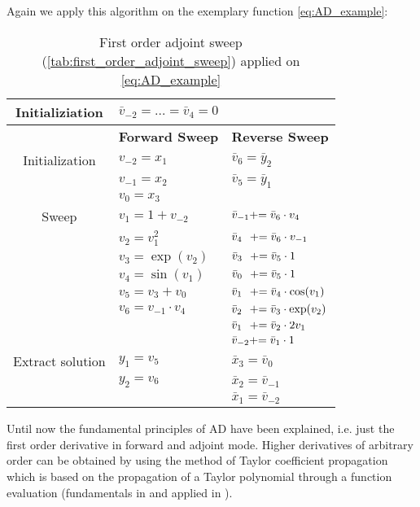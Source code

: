 \documentclass{scrartcl}[12pt, halfparskip]
\numberwithin{equation}{section}
\numberwithin{figure}{section}
\numberwithin{table}{section}
\begin{document}
Again we apply this algorithm on the exemplary function \cref{eq:AD_example}:

\begin{table}[H]
	\centering
	\begin{tabular}{| c | l | l |} \hline
		Initializiation & $\bar{v}_{-2}=\dots=\bar{v}_4=0$ & \\ \hline
		& \textbf{Forward Sweep} & \textbf{Reverse Sweep} \\ \hline
		Initialization & $v_{-2}=x_1$ & $\bar{v}_6=\bar{y}_2$ \\
		& $v_{-1}=x_2$ & $\bar{v}_5=\bar{y}_1$ \\
		& $v_{0}=x_3$ &  \\	\hline
		Sweep & $v_1=1+v_{-2}$ & $\bar{v}_{-1} +\hspace{-0.1cm}= \bar{v}_6 \cdot v_4$ \\
		& $v_2=v_{1}^2$ & $\bar{v}_{4} \ \ +\hspace{-0.1cm}= \bar{v}_6 \cdot v_{-1} $ \\
		& $v_3=\exp(v_2)$ & $\bar{v}_{3} \ \ +\hspace{-0.1cm}= \bar{v}_5 \cdot 1 $ \\
		& $v_4= \sin(v_1)$ & $\bar{v}_{0} \ \ +\hspace{-0.1cm}= \bar{v}_5 \cdot 1 $ \\
		& $v_5=v_{3} + v_0$ & $\bar{v}_{1} \ \ +\hspace{-0.1cm}= \bar{v}_4 \cdot \cos(v_1) $ \\
		& $v_6=v_{-1} \cdot v_4$ & $\bar{v}_{2} \ \ +\hspace{-0.1cm}= \bar{v}_3 \cdot \exp(v_2) $ \\
		& & $\bar{v}_1 \ \ +\hspace{-0.1cm}= \bar{v}_2 \cdot 2 v_1$ \\
		& & $\bar{v}_{-2} +\hspace{-0.1cm}= \bar{v}_1 \cdot 1$	\\ \hline
		Extract solution & $y_1 = v_5$ & $\bar{x}_3 = \bar{v}_0$ \\
		& $y_2 = v_6$ & $\bar{x}_2 = \bar{v}_{-1}$ \\
		& & $\bar{x}_1 = \bar{v}_{-2}$	\\ \hline
	\end{tabular}
	\caption{First order adjoint sweep (\cref{tab:first_order_adjoint_sweep}) applied on \cref{eq:AD_example}}
	\label{tab:AD_example_adjoint}
\end{table} 


Until now the fundamental principles of AD have been explained, i.e. just the first order derivative in forward and adjoint mode. Higher derivatives of arbitrary order can be obtained by using the method of Taylor coefficient propagation which is based on the propagation of a Taylor polynomial through a function evaluation (fundamentals in \cite{TC-prop_basis} and applied in \cite{diss_jan}). \\
\end{document}
